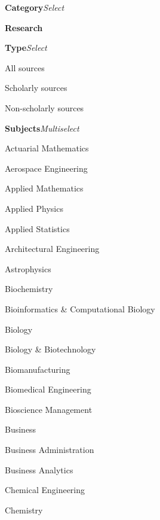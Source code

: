 \begin{CompactItemize}[leftmargin = *]
    \item \textbf{Category}\quad\textit{Select}
    \begin{CompactItemize}
        \item \textbf{Research}
        \begin{CompactItemize}
            \item \textbf{Type}\quad\textit{Select}
            \begin{CompactItemize}
                \item All sources
                \item Scholarly sources
                \item Non-scholarly sources
            \end{CompactItemize}
            \item \textbf{Subjects}\quad\textit{Multiselect}
            \begin{CompactItemize}
                \item Actuarial Mathematics
                \item Aerospace Engineering
                \item Applied Mathematics
                \item Applied Physics
                \item Applied Statistics
                \item Architectural Engineering
                \item Astrophysics
                \item Biochemistry
                \item Bioinformatics \& Computational Biology
                \item Biology
                \item Biology \& Biotechnology
                \item Biomanufacturing
                \item Biomedical Engineering
                \item Bioscience Management
                \item Business
                \item Business Administration
                \item Business Analytics
                \item Chemical Engineering
                \item Chemistry

\end{CompactItemize}
\end{CompactItemize}
\end{CompactItemize}
\end{CompactItemize}
